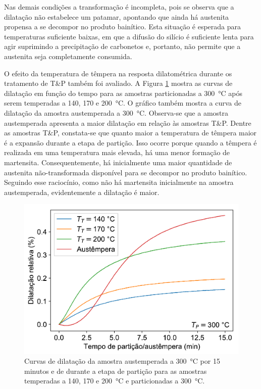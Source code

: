 Nas demais condições a transformação é incompleta, pois se observa que a dilatação não estabelece um patamar, apontando que ainda há austenita propensa a se decompor no produto bainítico. Esta situação é esperada para temperaturas suficiente baixas, em que a difusão do silício é suficiente lenta para agir suprimindo a precipitação de carbonetos e, portanto, não permite que a austenita seja completamente consumida.


O efeito da temperatura de têmpera na resposta dilatométrica durante os tratamento de T\&P também foi avaliado. A Figura \ref{fig:efeitoQT} mostra as curvas de dilatação em função do tempo para as amostras particionadas a \SI{300}{\degreeCelsius} após serem temperadas a 140, 170 e \SI{200}{\degreeCelsius}. O gráfico também mostra a curva de dilatação da amostra austemperada a \SI{300}{\degreeCelsius}. Observa-se que a amostra austemperada apresenta a maior dilatação em relação às amostras T\&P. Dentre as amostras T\&P, constata-se que quanto maior a temperatura de têmpera maior é a expansão durante a etapa de partição. Isso ocorre porque quando a têmpera é realizada em uma temperatura mais elevada, há uma menor formação de martensita. Consequentemente, há inicialmente uma maior quantidade de austenita não-transformada disponível para se decompor no produto bainítico. Seguindo esse raciocínio, como não há martensita inicialmente na amostra austemperada, evidentemente a dilatação é maior.

\begin{figure}
  \includegraphics[width=.8\textwidth]{img/dilatometria/dlxt_PT300.pdf}
  \caption{Curvas de dilatação da amostra austemperada a \SI{300}{\degreeCelsius} por 15 minutos e de durante a etapa de partição para as amostras temperadas a 140, 170 e \SI{200}{\degreeCelsius} e particionadas a \SI{300}{\degreeCelsius}.}
  \label{fig:efeitoQT}
\end{figure}

